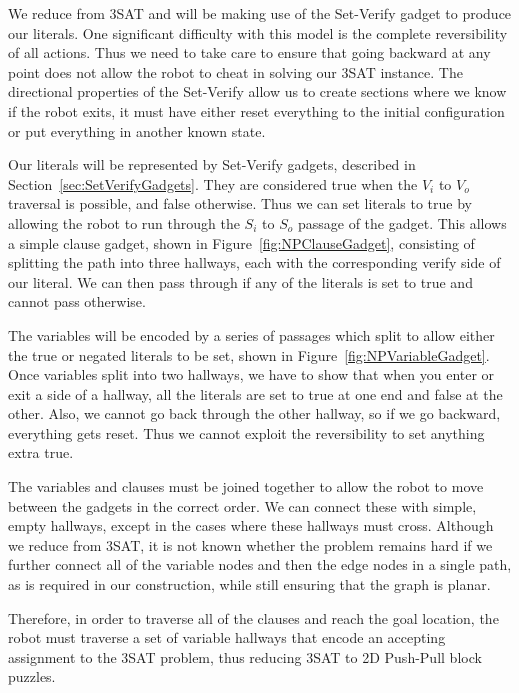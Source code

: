 We reduce from 3SAT and will be making use of the Set-Verify gadget to produce our literals. One significant difficulty with this model is the complete reversibility of all actions. Thus we need to take care to ensure that going backward at any point does not allow the robot to cheat in solving our 3SAT instance. The directional properties of the Set-Verify allow us to create sections where we know if the robot exits, it must have either reset everything to the initial configuration or put everything in another known state.

Our literals will be represented by Set-Verify gadgets, described in Section~\ref{sec:SetVerifyGadgets}. They are considered true when the $V_i$ to $V_o$ traversal is possible, and false otherwise. Thus we can set literals to true by allowing the robot to run through the $S_i$ to $S_o$ passage of the gadget. This allows a simple clause gadget, shown in Figure~\ref{fig:NPClauseGadget}, consisting of splitting the path into three hallways, each with the corresponding verify side of our literal. We can then pass through if any of the literals is set to true and cannot pass otherwise.

The variables will be encoded by a series of passages which split to allow either the true or negated literals to be set, shown in Figure~\ref{fig:NPVariableGadget}. Once variables split into two hallways, we have to show that when you enter or exit a side of a hallway, all the literals are set to true at one end and false at the other. Also, we cannot go back through the other hallway, so if we go backward, everything gets reset. Thus we cannot exploit the reversibility to set anything extra true.

The variables and clauses must be joined together to allow the robot to move between the gadgets in the correct order. We can connect these with simple, empty hallways, except in the cases where these hallways must cross. Although we reduce from 3SAT, it is not known whether the problem remains hard if we further connect all of the variable nodes and then the edge nodes in a single path, as is required in our construction, while still ensuring that the graph is planar.  

Therefore, in order to traverse all of the clauses and reach the goal location, the robot must traverse a set of variable hallways that encode an accepting assignment to the 3SAT problem, thus reducing 3SAT to 2D Push-Pull block puzzles.

